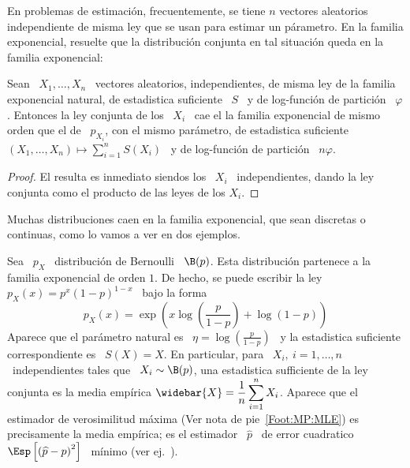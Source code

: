 En problemas  de estimaci\'on, frecuentemente, se tiene  $n$ vectores aleatorios
independiente  de misma  ley que  se  usan para  estimar un  p\'arametro. En  la
familia exponencial, resuelte que  la distribuci\'on conjunta en tal situaci\'on
queda en la familia exponencial:
%
\begin{lema}
  Sean \  $X_1 , \ldots ,  X_n$ \ vectores aleatorios,  independientes, de misma
  ley de la familia exponencial natural,  de estadistica suficiente \ $S$ \ y de
  log-funci\'on de  partici\'on \ $\varphi$. Entonces  la ley conjunta  de los \
  $X_i$ \ cae  el la familia exponencial  de mismo orden que el  de \ $p_{X_i}$,
  con  el   mismo  par\'ametro,  de  estadistica   suficiente  \  $\displaystyle
  (X_1,\ldots,X_n)  \mapsto  \sum_{i=1}^n  S(X_i)$   \  y  de  log-funci\'on  de
  partici\'on \ $n \varphi$.
\end{lema}
%
\begin{proof}
  El resulta  es inmediato siendos  los \ $X_i$  \ independientes, dando  la ley
  conjunta como el producto de las leyes de los $X_i$.
\end{proof}

Muchas  distribuciones caen  en la  familia  exponencial, que  sean discretas  o
continuas, como lo vamos a ver en dos ejemplos.
%
\begin{ejemplo}
  Sea  \ $p_X$  \ distribuci\'on  de Bernoulli  \ $\B(p)$.   Esta distribuci\'on
  partenece a la familia exponencial de  orden $1$.  De hecho, se puede escribir
  la ley \ $p_X(x) = p^x (1-p)^{1-x}$ \ bajo la forma
  \[
  p_X(x) = \exp\left( x \log \left( \frac{p}{1-p} \right) + \log(1-p) \right)
  \]
  Aparece  que el par\'ametro  natural es  \ $\eta  = \log  \left( \frac{p}{1-p}
  \right)$ \  y la estadistica  suficiente correspondiente es  \ $S(X) =  X$. En
  particular, para \  $X_i, \: i = 1,  \ldots , n$ \ independientes  tales que \
  $X_i \sim \B(p)$,  una estadistica sufficiente de la ley  conjunta es la media
  emp\'irica  $\displaystyle   \widebar{X}  =  \frac{1}{n}   \sum_{i=1}^n  X_i$.
  Aparece   que  el   estimador   de  verosimilitud   m\'axima   (Ver  nota   de
  pie~\ref{Foot:MP:MLE}) es precisamente la  media emp\'irica; es el estimador \
  $\widehat{p}$  \ de  error cuadratico  \  $\Esp\left[ \left(  \widehat{p} -  p
    \right)^2 \right]$ \ m\'inimo (ver ej.~\cite{Kay93}).
\end{ejemplo}

